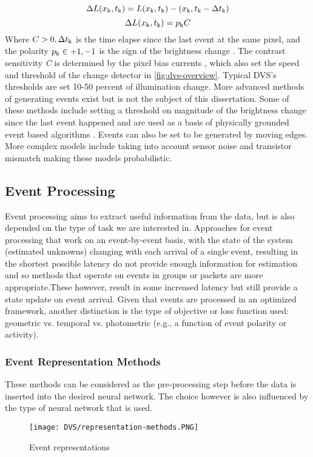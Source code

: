 \documentclass[12pt]{report}
\begin{document}
\begin{equation}
    \Delta L(x\textsubscript{k},t\textsubscript{k}) = L(x\textsubscript{k},t\textsubscript{k})-(x\textsubscript{k},t\textsubscript{k}-\Delta t\textsubscript{k})
\end{equation}
\begin{equation}
   \Delta L(x\textsubscript{k},t\textsubscript{k}) = p\textsubscript{k}C 
\end{equation}
Where \(C > 0, \Delta t\textsubscript{k}\) is the time elapse since the last event at the same pixel, and the polarity  \(p\textsubscript{k} \in {+1,-1}\) is the sign of the brightness change \cite{Lichtsteiner2008}. The contrast sensitivity \textit{C} is determined by the pixel bias currents \cite{nozaki2017} \cite{Gallego2020}, which also set the speed and threshold of the change detector in \ref{fig:dvs-overview}. Typical DVS's thresholds are set 10-50 percent of illumination change. More advanced methods of generating events exist but is not the subject of this dissertation. Some of these methods include setting a threshold on magnitude of the brightness change since the last event happened and are used as a basis of physically grounded event based algorithms \cite{Gallego2019}. Events can also be set to be generated by moving edges. More complex models include taking into account sensor noise and transistor mismatch making these models probabilistic. 

\subsection{Event Processing}
Event processing aims to extract useful information from the data, but is also depended on the type of task we are interested in. Approaches for event processing that work on an event-by-event basis, with the state of the system (estimated unknowns) changing with each arrival of a single event, resulting in the shortest possible latency do not provide enough information for estimation and so methods that operate on events in groups or packets are more appropriate.These however, result in some increased latency but still provide a state update on event arrival. Given that events are processed in an optimized framework, another distinction is the type of objective or loss function used: geometric vs. temporal vs. photometric (e.g., a function of event polarity or activity).

\subsubsection{Event Representation Methods}
These methods can be considered as the pre-processing step before the data is inserted into the desired neural network. The choice however is also influenced by the type of neural network that is used.
\begin{figure}[htp] %
    \centering
     \texttt{[image: DVS/representation-methods.PNG]}
    \caption{Event representations}
    \label{fig:representation-methods}
\end{figure}
\end{document}
